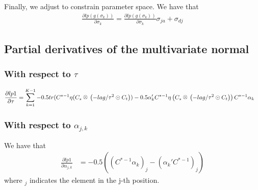 \documentclass[12pt]{article}
\newcommand{\kron}{\raisebox{1pt}{\ensuremath{\:\otimes\:}}}
\begin{document}
Finally, we adjust to constrain parameter space. We have that
\begin{align*}
\frac{\partial lp (g (\sigma_k))}{\partial \sigma_k} = \frac{\partial lp (g (\sigma_k))}{\partial \sigma_k} \sigma_{ja} + \sigma_{dj}
\end{align*}

\subsection{Partial derivatives of the multivariate normal}

\subsubsection{With respect to $\tau$}

\begin{align*}
\frac{ \partial lp1 }{ \partial \tau } &= \sum_{k=1}^{K-1} -0.5 tr(C^{* -1} \eta (C_s \kron \left(-lag/\tau^2 \odot C_t \right)) - 0.5 \alpha_k' C^{* -1} \eta \left(C_s \kron \left( -lag/\tau^2 \odot C_t \right) \right) C^{* -1} \alpha_k 
\end{align*}

\subsubsection{With respect to $\alpha_{j,k}$}

We have that
\begin{align*}
\frac{ \partial lp1 }{ \partial \alpha_{j,k} } &= -0.5 \left( (C^{* -1} \alpha_k)_{j} - (\alpha_k' C^{* -1})_{j} \right)
\end{align*}
where $_j$ indicates the element in the j-th position.




\end{document}
